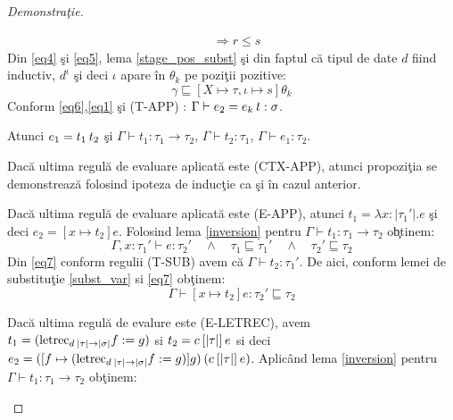 \begin{proof}[Demonstra\c tie]
\begin{description}
\begin{enumerate*}
\begin{equation}
\begin{split}
                    &\Rightarrow r \le s
            \end{split}
            \end{equation}
            Din \eqref{eq4} \c si \eqref{eq5}, lema \ref{stage_pos_subst} \c si din faptul c\u a tipul de date $d$ fiind inductiv, $d^{\iota}$ \c si deci $\iota$ apare \^ in $\theta_k$ pe pozi\c tii pozitive:
            \begin{equation}\label{eq6}
                \gamma \sqsubseteq [X \mapsto \tau, \iota \mapsto s] \theta_k
            \end{equation}
            Conform \eqref{eq6},\eqref{eq1} \c si {\scriptsize (T-APP)} : $\Gamma \vdash e_2 = e_k \hspace{2pt} t : \sigma$.
        \end{enumerate*}
  \item[{\scriptsize (T-APP)}] Atunci $e_1 = t_1 \hspace{2pt} t_2$ \c si $\Gamma \vdash t_1 : \tau_1 \to \tau_2 $, $\Gamma \vdash t_2 : \tau_1 $, $\Gamma \vdash e_1 : \tau_2 $.
        \begin{enumerate*}
        \item Dac\u a ultima regul\u a de evaluare aplicat\u a este {\scriptsize (CTX-APP)}, atunci propozi\c tia se demonstreaz\u a folosind ipoteza de induc\c tie ca \c si \^ in cazul anterior.
        \item Dac\u a ultima regul\u a de evaluare aplicat\u a este {\scriptsize (E-APP)}, atunci $t_1 = \lambda x : |\tau_1'| . e$ \c si deci $e_2 = [x \mapsto t_2] e$. Folosind lema \ref{inversion} pentru $\Gamma \vdash t_1 : \tau_1 \to \tau_2$ o\c btinem:
            \begin{equation}\label{eq7}
                \Gamma, x:\tau_1' \vdash e : \tau_2' \quad\wedge\quad \tau_1 \sqsubseteq \tau_1' \quad\wedge\quad \tau_2' \sqsubseteq \tau_2
            \end{equation}
            Din \eqref{eq7} conform regulii {\scriptsize (T-SUB)} avem c\u a $\Gamma \vdash t_2 : \tau_1'$. De aici, conform lemei de substitu\c tie \ref{subst_var} si \eqref{eq7} ob\c tinem:
            \begin{equation}
                \Gamma \vdash [x \mapsto t_2] e : \tau_2' \sqsubseteq \tau_2
            \end{equation}
        \item Dac\u a ultima regul\u a de evalure este  {\scriptsize (E-LETREC)}, avem $t_1 = (\text{letrec}_{d\hspace{2pt}|\tau| \to |\sigma|}f := g)$ si $t_2 = c\hspace{2pt} [|\tau|] \hspace{2pt} e$ si deci $e_2 = ([f \mapsto (\text{letrec}_{d\hspace{2pt}|\tau| \to |\sigma|}f := g)]g)\hspace{2pt}(c\hspace{2pt} [|\tau|] \hspace{2pt} e)$. Aplic\^ and lema \ref{inversion} pentru $\Gamma \vdash t_1 : \tau_1 \to \tau_2$ ob\c tinem:

\end{enumerate*}
\end{description}
\end{proof}
